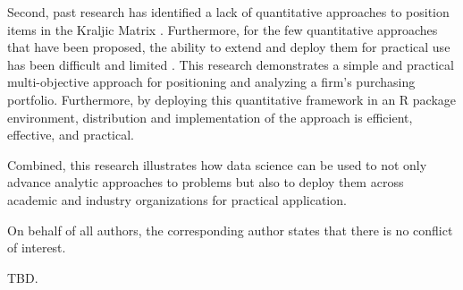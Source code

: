 \documentclass[twocolumn]{svjour3}       %
\begin{document}
Second, past research has identified a lack of quantitative approaches to position items in the Kraljic Matrix \citep{pwa12,wj04,ktp14}.  Furthermore, for the few quantitative approaches that have been proposed, the ability to extend and deploy them for practical use has been difficult and limited \citep{dpbhc08,pbtj13}. This research demonstrates a simple and practical multi-objective approach for positioning and analyzing a firm's purchasing portfolio. Furthermore, by deploying this quantitative framework in an R package environment, distribution and implementation of the approach is efficient, effective, and practical.

Combined, this research illustrates how data science can be used to not only advance analytic approaches to problems but also to deploy them across academic and industry organizations for practical application.

On behalf of all authors, the corresponding author states that there is no conflict of interest.



\begin{acknowledgements}
TBD.
\end{acknowledgements}

\end{document}

